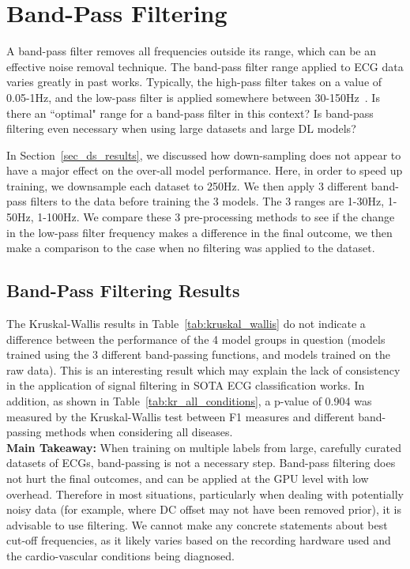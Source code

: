 \documentclass[pmlr,twocolumn]{jmlr}%
\begin{document}
\section{Band-Pass Filtering}
\label{sec:BandPass}
A band-pass filter removes all frequencies outside its range, which can be an effective noise removal technique. The band-pass filter range applied to ECG data varies greatly in past works. Typically, the high-pass filter takes on a value of 0.05-1Hz, and the low-pass filter is applied somewhere between 30-150Hz~\citep{uwaechia2021comprehensive,luo2010review}. Is there an ``optimal" range for a band-pass filter in this context? Is band-pass filtering even necessary when using large datasets and large DL models?

In Section~\ref{sec_ds_results}, we discussed how down-sampling does not appear to have a major effect on the over-all model performance. Here, in order to speed up training, we downsample each dataset to 250Hz. We then apply 3 different band-pass filters to the data before training the 3 models. The 3 ranges are 1-30Hz, 1-50Hz, 1-100Hz. We compare these 3 pre-processing methods to see if the change in the low-pass filter frequency makes a difference in the final outcome, we then make a comparison to the case when no filtering was applied to the dataset. 

\subsection{Band-Pass Filtering Results}
The Kruskal-Wallis results in Table~\ref{tab:kruskal_wallis} do not indicate a difference between the performance of the 4 model groups in question (models trained using the 3 different band-passing functions, and models trained on the raw data). This is an interesting result which may explain the lack of consistency in the application of signal filtering in SOTA ECG classification works. In addition, as shown in Table~\ref{tab:kr_all_conditions}, a p-value of 0.904 was measured by the Kruskal-Wallis test between F1 measures and different band-passing methods when considering all diseases. 
\\
\textbf{Main Takeaway:} When training on multiple labels from large, carefully curated datasets of ECGs, band-passing is not a necessary step. Band-pass filtering does not hurt the final outcomes, and can be applied at the GPU level with low overhead. Therefore in most situations, particularly when dealing with potentially noisy data (for example, where DC offset may not have been removed prior), it is advisable to use filtering. We cannot make any concrete statements about best cut-off frequencies, as it likely varies based on the recording hardware used and the cardio-vascular conditions being diagnosed. 
\end{document}
